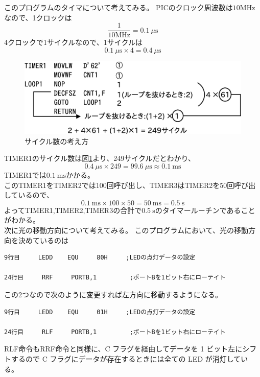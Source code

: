 \documentclass[a4paper,12pt]{ujarticle}
\begin{document}
   このプログラムのタイマについて考えてみる。
   PICのクロック周波数は$10\si{\mega\hertz}$なので、1クロックは
    \[
     \frac{1}{10\si{\mega\hertz}} = \SI{0.1}{\mu\second}
    \]
    4クロックで1サイクルなので、1サイクルは
    \[
     \SI{0.1}{\mu\second} \times 4 = \SI{0.4}{\mu\second}
    \]
     \begin{figure}[h]
      \begin{center}
       \includegraphics[width=130mm]{Diagram5.eps}
      \end{center}
      \caption{サイクル数の考え方}
      \label{fig:sicle}
     \end{figure}
     TIMER1のサイクル数は図\ref{fig:sicle}より、249サイクルだとわかり、
     \[
      \SI{0.4}{\mu\second} \times 249 = \SI{99.6}{\mu\second} \approx \SI{0.1}{\milli\second}
     \]
     TIMER1では$\SI{0.1}{\milli\second}$かかる。\\
     このTIMER1をTIMER2では100回呼び出し、TIMER3はTIMER2を50回呼び出しているので、
     \[
      \SI{0.1}{\milli\second} \times 100 \times 50 = \SI{50}{\milli\second} = \SI{0.5}{\second}
     \]
     よってTIMER1,TIMER2,TIMER3の合計で$\SI{0.5}{\second}$のタイマールーチンであることがわかる。\\

     次に光の移動方向について考えてみる。
     このプログラムにおいて、光の移動方向を決めているのは
      \begin{lstlisting}[basicstyle=\ttfamily\footnotesize, frame=single]
 9行目     LEDD    EQU     80H     ;LEDの点灯データの設定

24行目     RRF     PORTB,1         ;ポートBを1ビット右にローテイト
      \end{lstlisting}
      この2つなので次のように変更すれば左方向に移動するようになる。
      \begin{lstlisting}[basicstyle=\ttfamily\footnotesize, frame=single]
 9行目     LEDD    EQU     01H     ;LEDの点灯データの設定

24行目     RLF     PORTB,1         ;ポートBを1ビット右にローテイト
      \end{lstlisting}
      RLF命令もRRF命令と同様に、C フラグを経由してデータを 1 ビット左にシフトするので C フラグにデータが存在するときには全ての LED が消灯している。
\end{document}
